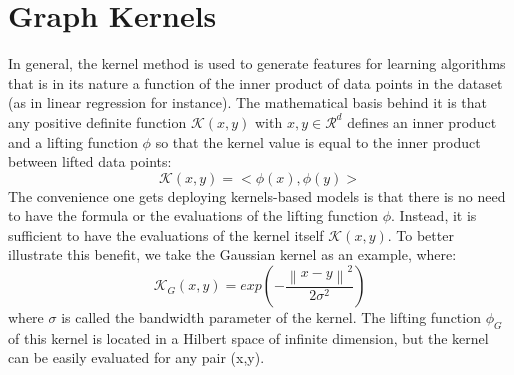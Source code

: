 \section{Graph Kernels}
In general, the kernel method is used to generate features for learning algorithms that is in its nature a function of the inner product of data points in the dataset (as in linear regression for instance). The mathematical basis behind it is that any positive definite function $\mathcal{K}(x,y)$ with $x,y \in \mathcal{R}^d$ defines an inner product and a lifting function $\phi$ so that the kernel value is equal to the inner product between lifted data points:
\begin{equation}
\label{eq:kernel_main_equation}
    \mathcal{K}(x,y) = <\phi(x),\phi(y)>
\end{equation}
The convenience one gets deploying kernels-based models is that there is no need to have the formula or the evaluations of the lifting function $\phi$. Instead, it is  sufficient to have the evaluations of the kernel itself $\mathcal{K}(x,y)$. To better illustrate this benefit, we take the Gaussian kernel as an example, where:
\begin{equation}
    \mathcal{K}_{G}(x,y)=exp(-\frac{\left \| x-y\right\|^2}{2\sigma^2})
\end{equation}
where $\sigma$ is called the bandwidth parameter of the kernel. The lifting function $\phi_G$ of this kernel is located in a Hilbert space of infinite dimension, but the kernel can be easily evaluated for any pair (x,y). 

